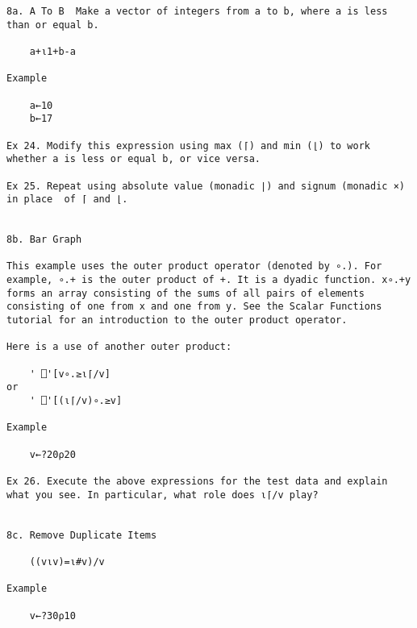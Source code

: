 \documentclass{article}
\begin{document}
\begin{verbatim}
8a. A To B  Make a vector of integers from a to b, where a is less    
than or equal b.                                                      

	a+⍳1+b-a                                                             

Example                                                               

	a←10                                                                 
	b←17                                                                 

Ex 24. Modify this expression using max (⌈) and min (⌊) to work       
whether a is less or equal b, or vice versa.                          

Ex 25. Repeat using absolute value (monadic ∣) and signum (monadic ×) 
in place  of ⌈ and ⌊.                                                 


8b. Bar Graph                                                         

This example uses the outer product operator (denoted by ∘.). For     
example, ∘.+ is the outer product of +. It is a dyadic function. x∘.+y
forms an array consisting of the sums of all pairs of elements        
consisting of one from x and one from y. See the Scalar Functions     
tutorial for an introduction to the outer product operator.           

Here is a use of another outer product:                               

	' ⎕'[v∘.≥⍳⌈/v]                                                       
or                                                                    
	' ⎕'[(⍳⌈/v)∘.≥v]                                                     

Example                                                               

	v←?20⍴20                                                             

Ex 26. Execute the above expressions for the test data and explain    
what you see. In particular, what role does ⍳⌈/v play?                


8c. Remove Duplicate Items                                            

	((v⍳v)=⍳#v)/v                                                        

Example                                                               

 	v←?30⍴10                                                            


\end{verbatim}
\end{document}
